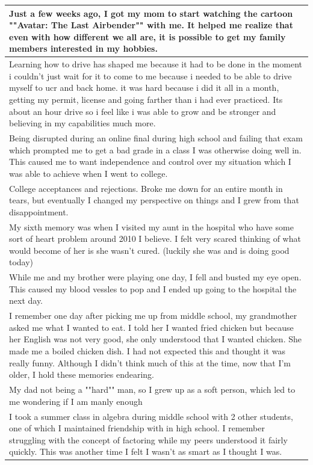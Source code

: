 \documentclass[
  .7em,
  letterpaper,
  DIV=11,
  numbers=noendperiod]{scrartcl}
\begin{document}
\begin{table}
\begin{tabular}{l}
\hline
Just a few weeks ago, I got my mom to start watching the cartoon ""Avatar: The Last Airbender"" with me. It helped me realize that even with how different we all are, it is possible to get my family members interested in my hobbies.\\
\hline
Learning how to drive has shaped me because it had to be done in the moment i couldn't just wait for it to come to me because i needed to be able to drive myself to ucr and back home. it was hard because i did it all in a month, getting my permit, license and going farther than i had ever practiced. Its about an hour drive so i feel like i was able to grow and be stronger and believing in my capabilities much more.\\
\hline
Being disrupted during an online final during high school and failing that exam which prompted me to get a bad grade in a class I was otherwise doing well in. This caused me to want independence and control over my situation which I was able to achieve when I went to college.\\
\hline
College acceptances and rejections. Broke me down for an entire month in tears, but eventually I changed my perspective on things and I grew from that disappointment.\\
\hline
My sixth memory was when I visited my aunt in the hospital who have some sort of heart problem around 2010 I believe. I felt very scared thinking of what would become of her is she wasn't cured. (luckily she was and is doing good today)\\
\hline
While me and my brother were playing one day, I fell and busted my eye open. This caused my blood vessles to pop and I ended up going to the hospital the next day.\\
\hline
I remember one day after picking me up from middle school, my grandmother asked me what I wanted to eat. I told her I wanted fried chicken but because her English was not very good, she only understood that I wanted chicken. She made me a boiled chicken dish. I had not expected this and thought it was really funny. Although I didn’t think much of this at the time, now that I’m older, I hold these memories endearing.\\
\hline
My dad not being a ""hard"" man, so I grew up as a soft person, which led to me wondering if I am manly enough\\
\hline
I took a summer class in algebra during middle school with 2 other students, one of which I maintained friendship with in high school. I remember struggling with the concept of factoring while my peers understood it fairly quickly. This was another time I felt I wasn't as smart as I thought I was.\\

\end{tabular}
\end{table}
\end{document}
